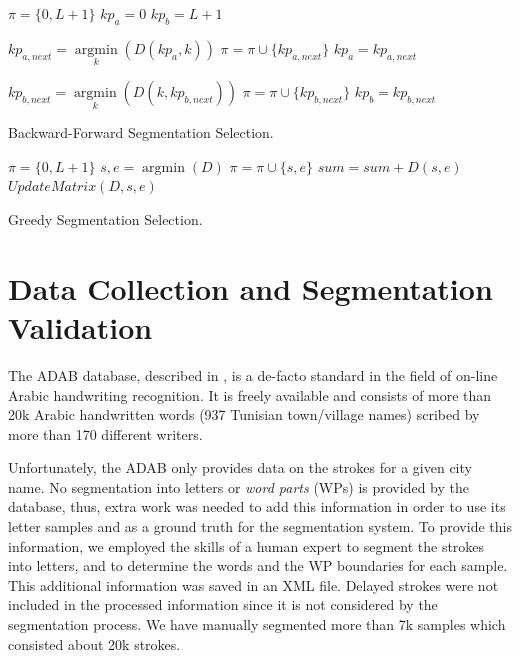 \documentclass[10pt, conference, compsocconf]{IEEEtran}
\begin{document}
\begin{algorithm}
$\pi = \{0,L+1\}$\;
$kp_{a}=0$\;
$kp_{b}=L+1$\;
{
	$kp_{a,next} = \mathop {\arg \min}\limits_k (D(kp_a,k))$\;
	$\pi = \pi \cup \{kp_{a,next}\}$\;
	$kp_{a}=kp_{a,next}$\;
	
	$kp_{b,next} = \mathop {\arg \min}\limits_k (D(k,kp_{b,next}))$\;
	$\pi = \pi \cup \{kp_{b,next}\}$\;	
	$kp_{b}=kp_{b,next}$\;
}
\caption{Backward-Forward Segmentation Selection.}
\label{alg:bfss}
\end{algorithm}

\begin{algorithm}
$\pi = \{0,L+1\}$\;
{
	${s,e} = \mathop {\arg \min}(D)$\;
	$\pi = \pi \cup \{s,e\}$\;
	$sum = sum + D(s,e)$\;
	$UpdateMatrix(D,s,e)$\;
}
\caption{Greedy Segmentation Selection.}
\label{alg:gss}
\end{algorithm}

\section{Data Collection and Segmentation Validation}
\label{sec:data_collection_segmentation_validation}
The ADAB database, described in \cite{el2009icdar}, is a de-facto standard in the field of on-line Arabic handwriting recognition. 
It is freely available and consists of more than 20k Arabic handwritten words (937 Tunisian town/village names) scribed by more than 170 different writers. 

Unfortunately, the ADAB only provides data on the strokes for a given city name. 
No segmentation into letters or \emph{word parts} (WPs) is provided by the database, thus, extra work was needed to add this information in order to use its letter samples and as a ground truth for the segmentation system.
To provide this information, we employed the skills of a human expert to segment the strokes into letters, and to determine the words and the WP boundaries for each sample. 
This additional information was saved in an XML file. 
Delayed strokes were not included in the processed information since it is not considered by the segmentation process.
We have manually segmented more than 7k samples which consisted about 20k strokes. \\

\end{document}
